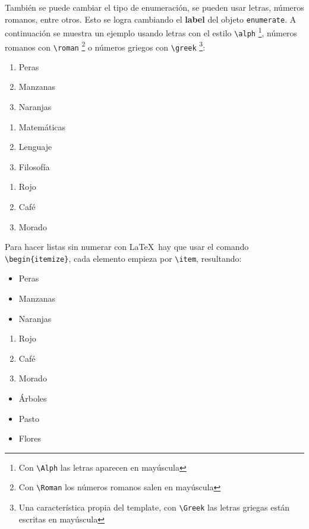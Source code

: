 		También se puede cambiar el tipo de enumeración, se pueden usar letras, números romanos, entre otros. Esto se logra cambiando el \textbf{label} del objeto \texttt{enumerate}. A continuación se muestra un ejemplo usando letras con el estilo \texttt{\textbackslash alph} \footnote{Con \texttt{\textbackslash Alph} las letras aparecen en mayúscula}, números romanos con \texttt{\textbackslash roman} \footnote{Con \texttt{\textbackslash Roman} los números romanos salen en mayúscula} o números griegos con \texttt{\textbackslash greek} \footnote{Una característica propia del template, con \texttt{\textbackslash Greek} las letras griegas están escritas en mayúscula}:
		
		\begin{multicols}{3}
			\begin{enumerate}[label=\alph*) ,font=\bfseries] %
				\item Peras
				\item Manzanas
				\item Naranjas
			\end{enumerate}
			
			\begin{enumerate}[label=\greek*) ]
				\item Matemáticas
				\item Lenguaje
				\item Filosofía
			\end{enumerate}
		
			\begin{enumerate}[label=\roman*) ]
				\item Rojo
				\item Café
				\item Morado
			\end{enumerate}
		\end{multicols}
		
		Para hacer listas sin numerar con \LaTeX\ hay que usar el comando \texttt{\textbackslash begin\{itemize\}}, cada elemento empieza por \texttt{\textbackslash item}, resultando:
		
		\begin{multicols}{3}
			\begin{itemize}[label={--}]
				\item Peras
				\item Manzanas
				\item Naranjas
			\end{itemize}
			
			\begin{enumerate}[label={*}]
				\item Rojo
				\item Café
				\item Morado
			\end{enumerate}
			
			\begin{itemize}
				\item Árboles
				\item Pasto
				\item Flores
			\end{itemize}
		\end{multicols}
		

